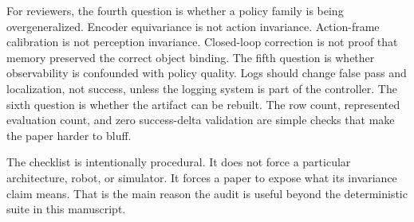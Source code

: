 \documentclass{article}
\begin{document}
For reviewers, the fourth question is whether a policy family is being overgeneralized. Encoder equivariance is not action invariance. Action-frame calibration is not perception invariance. Closed-loop correction is not proof that memory preserved the correct object binding. The fifth question is whether observability is confounded with policy quality. Logs should change false pass and localization, not success, unless the logging system is part of the controller. The sixth question is whether the artifact can be rebuilt. The row count, represented evaluation count, and zero success-delta validation are simple checks that make the paper harder to bluff.

The checklist is intentionally procedural. It does not force a particular architecture, robot, or simulator. It forces a paper to expose what its invariance claim means. That is the main reason the audit is useful beyond the deterministic suite in this manuscript.
\end{document}
